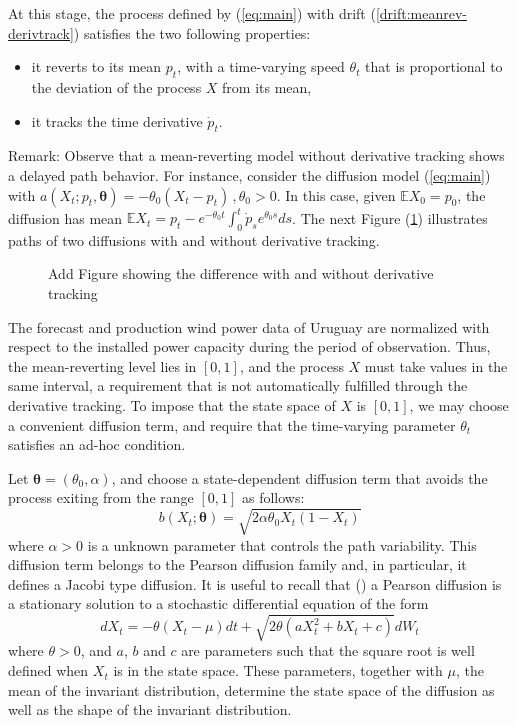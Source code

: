 \documentclass[11pt]{article}
\theoremstyle{definition}
\begin{document}
 At this stage, the process defined by (\ref{eq:main}) with drift (\ref{drift:meanrev-derivtrack}) satisfies the two following properties: 
\begin{itemize}
\item it reverts to its mean $p_t$, with a time-varying speed $ \theta_t$ that is proportional to the deviation of the process $X$ from its mean,
\item it tracks the time derivative $\dot{p}_t$.  
\end{itemize} 

Remark: Observe that a mean-reverting model without derivative tracking shows a delayed path behavior. For instance, consider the diffusion model (\ref{eq:main}) with $a(X_t; p_t, \bm{\theta}) = - \theta_0 (X_t - p_t)\,, \theta_0 > 0$. In this case, given  $ \mathbb{E} X_0 = p_0$, the diffusion has mean $\mathbb{E} X_t = p_t - e^{- \theta_0 t } \int_0^t \dot{p}_s  e^{\theta_0 s} ds$. The next Figure (\ref{fig:derivative_tracking}) illustrates paths of two diffusions with and without derivative tracking. 

\begin{figure}[h]
  \caption{{\color{red} Add Figure showing the difference with and without derivative tracking}}
  \label{fig:derivative_tracking}
\end{figure}

The forecast and production wind power data of Uruguay are normalized with respect to the installed power capacity during the period of observation. Thus, the mean-reverting level lies in $[0,1]$, and the process $X$  must take values in the same interval, a requirement that is not automatically fulfilled through the derivative tracking. To impose that the state space of $X$ is $[0,1]$, we may choose a convenient diffusion term, and require that the time-varying parameter $ \theta_t$ satisfies an ad-hoc condition.
 
Let $\bm{\theta} = (\theta_0,\alpha)$, and choose a state-dependent diffusion term that avoids the process exiting from the range $[0,1]$ as follows:
  \begin{equation}
    b (X_t; \bm{\theta} )= \sqrt{2 \alpha \theta_0 X_t (1 - X_t)}
  \end{equation}
  where $\alpha >0$ is a unknown parameter that controls the path variability. This diffusion term belongs to the Pearson diffusion family and, in particular, it defines a Jacobi type diffusion. It is useful to recall that (\cite[440]{foso}) a Pearson diffusion is a stationary solution to a stochastic differential equation of the form
 \begin{equation}
    dX_t = - \theta (X_t - \mu) dt + \sqrt{2 \theta (a X_t^2 + b X_t + c)} dW_t
  \end{equation}
where $\theta>0$, and $a$, $b$ and $c$ are parameters such that the square root is well defined when $X_t$ is in the state space. These parameters, together with $\mu$, the mean of the invariant distribution, determine the state space of the diffusion as well as the shape of the invariant distribution. 
\end{document}
